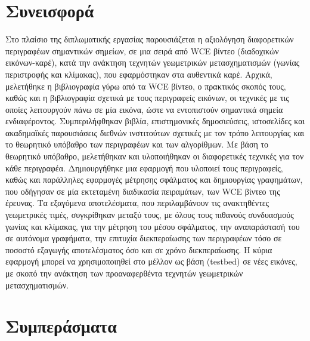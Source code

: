 \section{Συνεισφορά}

Στο πλαίσιο της διπλωματικής εργασίας παρουσιάζεται η αξιολόγηση διαφορετικών περιγραφέων σημαντικών σημείων, σε μια σειρά από
WCE βίντεο (διαδοχικών εικόνων-καρέ), κατά την ανάκτηση τεχνητών γεωμετρικών μετασχηματισμών (γωνίας περιστροφής και κλίμακας), που εφαρμόστηκαν 
στα αυθεντικά καρέ. Αρχικά, μελετήθηκε η βιβλιογραφία γύρω από τα WCE βίντεο, ο πρακτικός σκοπός τους, καθώς και η βιβλιογραφία 
σχετικά με τους περιγραφείς εικόνων, οι τεχνικές με τις οποίες λειτουργούν πάνω σε μία εικόνα, ώστε να 
εντοπιστούν σημαντικά σημεία ενδιαφέροντος. Συμπεριλήφθηκαν βιβλία, επιστημονικές δημοσιεύσεις, ιστοσελίδες και ακαδημαϊκές παρουσιάσεις διεθνών ινστιτούτων
σχετικές με τον τρόπο λειτουργίας και το θεωρητικό υπόβαθρο των περιγραφέων και των αλγορίθμων.
 Με βάση το θεωρητικό υπόβαθρο, μελετήθηκαν και υλοποιήθηκαν οι διαφορετικές τεχνικές για τον κάθε περιγραφέα. Δημιουργήθηκε μια εφαρμογή που υλοποιεί
 τους περιγραφείς, καθώς και παράλληλες εφαρμογές μέτρησης σφάλματος και δημιουργίας γραφημάτων, που οδήγησαν σε μία εκτεταμένη διαδικασία πειραμάτων,
 των WCE βίντεο της έρευνας. Τα εξαγόμενα αποτελέσματα, που περιλαμβάνουν τις ανακτηθέντες γεωμετρικές τιμές, συγκρίθηκαν μεταξύ τους, με 
 όλους τους πιθανούς συνδυασμούς γωνίας και κλίμακας, για την μέτρηση του μέσου σφάλματος, την αναπαράστασή του σε αυτόνομα γραφήματα,
 την επιτυχία διεκπεραίωσης των περιγραφέων τόσο σε ποσοστό εξαγωγής αποτελέσματος όσο και σε χρόνο διεκπεραίωσης.
 Η κύρια εφαρμογή μπορεί να χρησιμοποιηθεί στο μέλλον ως βάση (testbed) σε νέες εικόνες, με σκοπό την ανάκτηση των προαναφερθέντα τεχνητών γεωμετρικών μετασχηματισμών.
 
 \section{Συμπεράσματα}


